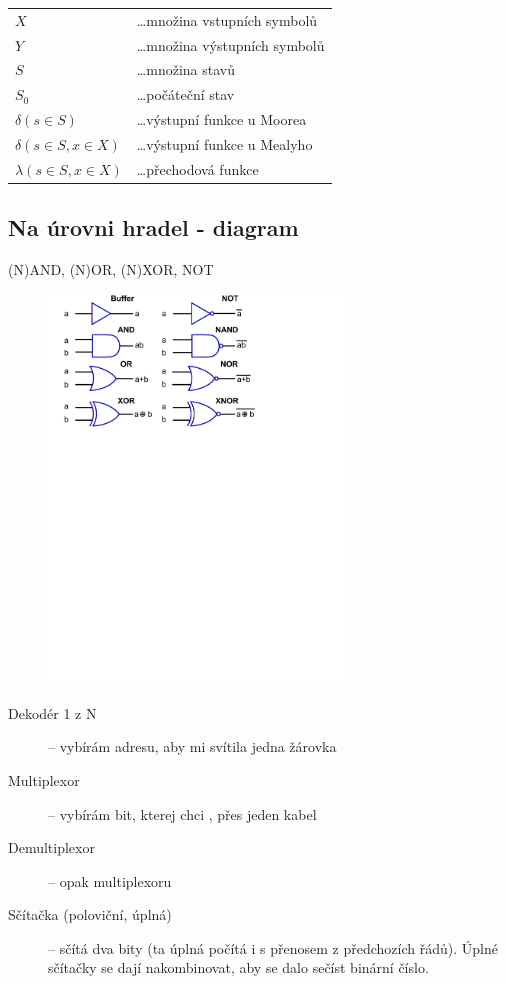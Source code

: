\documentclass{szzclass}
\begin{document}
\begin{tabular}{l l}
$X$ & \dots množina vstupních symbolů \\
$Y$ & \dots množina výstupních symbolů \\
$S$ & \dots množina stavů \\
$S_0$ & \dots počáteční stav \\
$\delta(s\in S)$ & \dots výstupní funkce u Moorea\\
$\delta(s\in S,x\in X)$ & \dots výstupní funkce u Mealyho\\
$\lambda(s\in S,x\in X)$ & \dots přechodová funkce
\end{tabular}

\subsection{Na úrovni hradel - diagram}
(N)AND, (N)OR, (N)XOR, NOT

\begin{figure}[h]
\includegraphics[width=8cm]{gates}
\end{figure}

\begin{description}
  \item [Dekodér 1 z N] -- vybírám adresu, aby mi svítila jedna žárovka
  \item [Multiplexor] -- vybírám bit, kterej chci , přes jeden kabel
  \item [Demultiplexor] -- opak multiplexoru
  \item [Sčítačka (poloviční, úplná)] -- sčítá dva bity (ta úplná počítá i s přenosem z předchozích řádů). Úplné sčítačky se dají nakombinovat, aby se dalo sečíst binární číslo.
\end{description}
\end{document}
